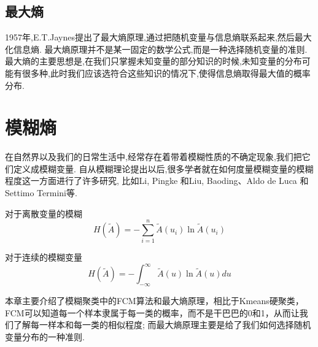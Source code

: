 \subsection{最大熵}
1957年,E.T.Jaynes提出了最大熵原理,通过把随机变量与信息熵联系起来,然后最大化信息熵.
最大熵原理并不是某一固定的数学公式,而是一种选择随机变量的准则.
最大熵的主要思想是,在我们只掌握未知变量的部分知识的时候,未知变量的分布可能有很多种,此时我们应该选符合这些知识的情况下,使得信息熵取得最大值的概率分布.

\section{模糊熵}
在自然界以及我们的日常生活中,经常存在着带着模糊性质的不确定现象,我们把它们定义成模糊变量.
自从模糊理论提出以后,很多学者就在如何度量模糊变量的模糊程度这一方面进行了许多研究,
比如Li, Pingke 和Liu, Baoding\cite{li2008entropy}、Aldo de Luca 和 Settimo Termini\cite{RN3}等.
\begin{definition}[模糊熵]
    对于离散变量的模糊
    \begin{equation}
        H(\tilde{A})=-\sum_{i=1}^{n}\tilde{A}(u_i) \ln \tilde{A}(u_i)
    \end{equation}

    对于连续的模糊变量
    \begin{equation}
        H(\tilde{A})=-\int_{-\infty}^{\infty}\tilde{A}(u) \ln \tilde{A}(u) d u
    \end{equation}

\end{definition}
本章主要介绍了模糊聚类中的FCM算法和最大熵原理，相比于Kmeans硬聚类，FCM可以知道每一个样本隶属于每一类的概率，而不是干巴巴的0和1，从而让我们了解每一样本和每一类的相似程度;
而最大熵原理主要是给了我们如何选择随机变量分布的一种准则.